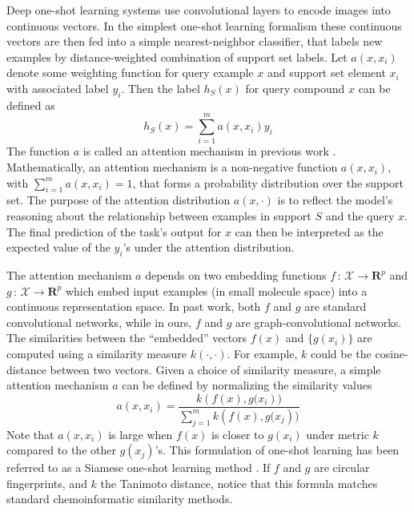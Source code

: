 Deep one-shot learning systems \cite{santoro2016one, vinyals2016matching} use convolutional layers to encode images into continuous vectors. In the simplest one-shot learning formalism these continuous vectors are then fed into a simple nearest-neighbor classifier, that labels new examples by distance-weighted combination of support set labels. Let $a(x, x_i)$ denote some weighting function for query example $x$ and support set element $x_i$ with associated label $y_i$. Then the label $h_S(x)$ for query compound $x$ can be defined as
\[
h_S(x) = \sum\limits_{i=1}^{m}a\left(x,x_i\right)y_i
\]
The function $a$ is called an attention mechanism in previous work \cite{vinyals2016matching}. Mathematically, an attention mechanism is a non-negative function $a(x,x_i)$, with $\sum\nolimits_{i=1}^{m}a(x,x_i)=1$, that forms a probability distribution over the support set. The purpose of the attention distribution $a(x, \cdot)$ is to reflect the model's reasoning about the relationship between examples in support $S$ and the query $x$. The final prediction of the task's output for $x$ can then be interpreted as the expected value of the $y_i$'s under the attention distribution.

The attention mechanism $a$ depends on two embedding functions $f\,:\,\mathcal{X}\rightarrow\mathbf{R}^p$ and $g\,:\,\mathcal{X}\rightarrow\mathbf{R}^p$ which embed input examples (in small molecule space) into a continuous representation space. In past work, both $f$ and $g$ are standard convolutional networks, while in ours, $f$ and $g$ are graph-convolutional networks. The similarities between the ``embedded'' vectors $f(x)$ and $\{g(x_i)\}$ are computed using a similarity measure $k(\cdot,\cdot)$.  For example, $k$ could be the cosine-distance between two vectors. Given a choice of similarity measure, a simple attention mechanism $a$ can be defined by normalizing the similarity values
\[
a(x,x_i) = \frac{k\left(f(x),g(x_i\right))}{\sum\nolimits_{j=1}^{m} k\left(f(x),g(x_j\right))}
\]
Note that $a(x,x_i)$ is large when $f(x)$ is closer to $g(x_i)$ under metric $k$ compared to the other $g(x_j)$'s. This formulation of one-shot learning has been referred to as a Siamese one-shot learning method \cite{koch2015siamese}. If $f$ and $g$ are circular fingerprints\cite{rogers2010extended}, and $k$ the Tanimoto distance, notice that this formula matches standard chemoinformatic similarity methods.


